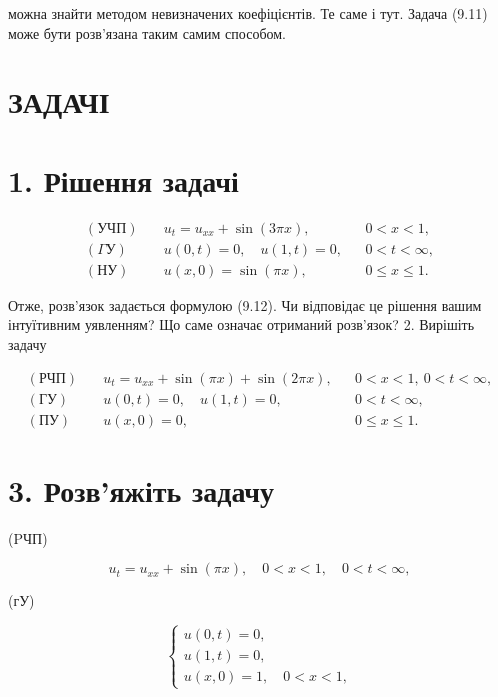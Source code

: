 можна знайти методом невизначених коефіцієнтів. Те саме і тут. Задача (9.11) може бути розв'язана таким самим способом.

\section{ЗАДАЧІ}\label{ux437ux430ux434ux430ux447ux456}

\section{1. Рішення задачі}\label{ux440ux456ux448ux435ux43dux43dux44f-ux437ux430ux434ux430ux447ux456}

\[
\begin{aligned}
(\text{УЧП}) \quad & u_t = u_{xx} + \sin(3\pi x), && 0 < x < 1, \\
(\Gamma \text{У}) \quad & u(0,t) = 0,\quad u(1,t) = 0, && 0 < t < \infty, \\
(\text{НУ}) \quad & u(x,0) = \sin(\pi x), && 0 \leqslant x \leqslant 1.
\end{aligned}
\]

Отже, розв'язок задається формулою (9.12). Чи відповідає це рішення вашим інтуїтивним уявленням? Що саме означає отриманий розв'язок? 2. Вирішіть задачу

\[
\begin{aligned}
(\text{РЧП})\quad & u_t = u_{xx} + \sin(\pi x) + \sin(2\pi x), && 0 < x < 1,\ 0 < t < \infty,\\
(\text{ГУ})\quad & u(0,t)=0,\quad u(1,t)=0, && 0 < t < \infty,\\
(\text{ПУ})\quad & u(x,0)=0, && 0 \le x \le 1.
\end{aligned}
\]

\section{3. Розв'яжіть задачу}\label{ux440ux43eux437ux432ux44fux436ux456ux442ux44c-ux437ux430ux434ux430ux447ux443}

(PЧП)

\[
u_t = u_{xx} + \sin(\pi x), \quad 0 < x < 1, \quad 0 < t < \infty,
\]

(гУ)

\[
\begin{cases} u(0, t) = 0, \\ u(1, t) = 0, \\ u(x, 0) = 1, \quad 0 < x < 1, \end{cases}
\]

